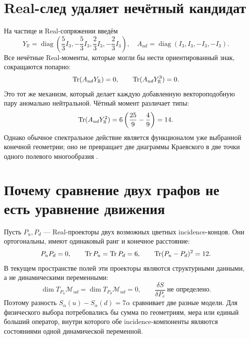 \section{Real-след удаляет нечётный кандидат}

На частице и Real-сопряжении введём
\begin{equation}
 Y_{\mathbb R}=\operatorname{diag}
 \left(\frac53I_3,-\frac53I_3,
       \frac23I_3,-\frac23I_3\right),
 \quad
 A_{ud}=\operatorname{diag}(I_3,I_3,-I_3,-I_3).
 \label{eq:v8-up-down-selector-real-hypercharge}
\end{equation}
Все нечётные Real-моменты, которые могли бы нести ориентированный знак,
сокращаются попарно:
\begin{equation}
 \operatorname{Tr}(A_{ud}Y_{\mathbb R})=0,
 \qquad
 \operatorname{Tr}(A_{ud}Y_{\mathbb R}^{3})=0.
 \label{eq:v8-up-down-selector-odd-real-cancellation}
\end{equation}
Это тот же механизм, который делает каждую добавленную вектороподобную пару
аномально нейтральной. Чётный момент различает типы:
\begin{equation}
 \operatorname{Tr}(A_{ud}Y_{\mathbb R}^{2})
 =6\left(\frac{25}{9}-\frac49\right)=14.
 \label{eq:v8-up-down-selector-even-real-discriminator}
\end{equation}
Однако обычное спектральное действие является функционалом уже выбранной
конечной геометрии; оно не превращает две диаграммы Краевского в две точки
одного полевого многообразия \cite{v8-up-down-selector-krajewski,
v8-up-down-selector-spectral-action}.

\section{Почему сравнение двух графов не есть уравнение движения}

Пусть $P_u,P_d$ --- Real-проекторы двух возможных цветных incidence-концов.
Они ортогональны, имеют одинаковый ранг и конечное расстояние:
\begin{equation}
 P_uP_d=0,\qquad \operatorname{Tr} P_u=\operatorname{Tr} P_d=6,\qquad
 \operatorname{Tr}(P_u-P_d)^2=12.
 \label{eq:v8-up-down-selector-projector-distance}
\end{equation}
В текущем пространстве полей эти проекторы являются структурными данными,
а не динамическими переменными:
\begin{equation}
 \dim T_{P_u}\mathcal M_{ud}
 =\dim T_{P_d}\mathcal M_{ud}=0,
 \qquad \frac{\delta S}{\delta P_e}\ \text{не определено}.
 \label{eq:v8-up-down-selector-zero-tangent}
\end{equation}
Поэтому разность $S_\alpha(u)-S_\alpha(d)=7\alpha$ сравнивает две разные
модели. Для физического выбора потребовались бы сумма по геометриям, мера
или единый больший оператор, внутри которого обе incidence-компоненты
являются состояниями одной динамической переменной.

